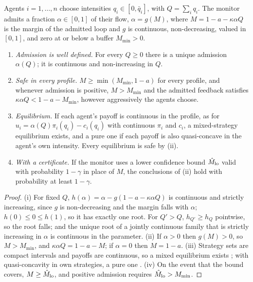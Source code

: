 \begin{proposition}\label{prop:throttle}
Agents $i=1,\dots,n$ choose intensities $q_i\in[0,\bar q_i]$, with $Q=\sum_iq_i$. The monitor admits a fraction $\alpha\in[0,1]$ of their flow, $\alpha=g(M)$, where $M=1-a-\kappa\alpha Q$ is the margin of the admitted loop and $g$ is continuous, non-decreasing, valued in $[0,1]$, and zero at or below a buffer $M_{\min}>0$.
\begin{enumerate}[label=(\roman*)]
\item \emph{Admission is well defined.} For every $Q\ge0$ there is a unique admission $\alpha(Q)$; it is continuous and non-increasing in $Q$.
\item \emph{Safe in every profile.} $M\ge\min(M_{\min},1-a)$ for every profile, and whenever admission is positive, $M>M_{\min}$ and the admitted feedback satisfies $\kappa\alpha Q<1-a-M_{\min}$, however aggressively the agents choose.
\item \emph{Equilibrium.} If each agent's payoff is continuous in the profile, as for $u_i=\alpha(Q)\pi_i(q_i)-c_i(q_i)$ with continuous $\pi_i$ and $c_i$, a mixed-strategy equilibrium exists, and a pure one if each payoff is also quasi-concave in the agent's own intensity. Every equilibrium is safe by (ii).
\item \emph{With a certificate.} If the monitor uses a lower confidence bound $\hat M_{\rm lo}$ valid with probability $1-\gamma$ in place of $M$, the conclusions of (ii) hold with probability at least $1-\gamma$.
\end{enumerate}
\hfill\Proved
\end{proposition}

\begin{proof}
(i) For fixed $Q$, $h(\alpha)=\alpha-g(1-a-\kappa\alpha Q)$ is continuous and strictly increasing, since $g$ is non-decreasing and the margin falls with $\alpha$; $h(0)\le0\le h(1)$, so it has exactly one root. For $Q'>Q$, $h_{Q'}\ge h_Q$ pointwise, so the root falls; and the unique root of a jointly continuous family that is strictly increasing in $\alpha$ is continuous in the parameter. (ii) If $\alpha>0$ then $g(M)>0$, so $M>M_{\min}$, and $\kappa\alpha Q=1-a-M$; if $\alpha=0$ then $M=1-a$. (iii) Strategy sets are compact intervals and payoffs are continuous, so a mixed equilibrium exists \citep{t:glicksberg1952}; with quasi-concavity in own strategies, a pure one \citep{t:debreu1952,t:fan1952}. (iv) On the event that the bound covers, $M\ge\hat M_{\rm lo}$, and positive admission requires $\hat M_{\rm lo}>M_{\min}$.
\end{proof}

